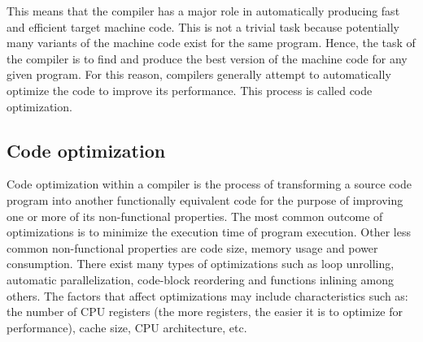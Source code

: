 This means that the compiler has a major role in automatically producing fast and efficient target machine code. This is not a trivial task because potentially many variants of the machine code exist for the same program. Hence, the task of the compiler is to find and produce the best version of the machine code for any given program. For this reason, compilers generally attempt to automatically optimize the code to improve its performance.
This process is called code optimization. 

\subsection{Code optimization}

Code optimization within a compiler is the process of transforming a source code program into another functionally equivalent code for the purpose of improving one or more of its non-functional properties. 
The most common outcome of optimizations is to minimize the execution time of program execution. Other less common non-functional properties are code size, memory usage and power consumption. 
There exist many types of optimizations such as loop unrolling, automatic parallelization, code-block reordering and functions inlining among others. The factors that affect optimizations may include characteristics such as: the number of CPU registers (the more registers, the easier it is to optimize for performance), cache size, CPU architecture, etc.

